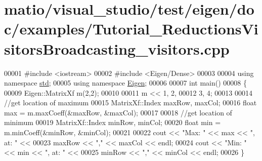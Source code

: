 \hypertarget{matio_2visual__studio_2test_2eigen_2doc_2examples_2_tutorial___reductions_visitors_broadcasting__visitors_8cpp_source}{}\section{matio/visual\+\_\+studio/test/eigen/doc/examples/\+Tutorial\+\_\+\+Reductions\+Visitors\+Broadcasting\+\_\+visitors.cpp}
\label{matio_2visual__studio_2test_2eigen_2doc_2examples_2_tutorial___reductions_visitors_broadcasting__visitors_8cpp_source}

\begin{DoxyCode}
00001 \textcolor{preprocessor}{#include <iostream>}
00002 \textcolor{preprocessor}{#include <Eigen/Dense>}
00003 
00004 \textcolor{keyword}{using namespace }\hyperlink{namespacestd}{std};
00005 \textcolor{keyword}{using namespace }\hyperlink{namespace_eigen}{Eigen};
00006 
00007 \textcolor{keywordtype}{int} main()
00008 \{
00009   Eigen::MatrixXf m(2,2);
00010   
00011   m << 1, 2,
00012        3, 4;
00013 
00014   \textcolor{comment}{//get location of maximum}
00015   MatrixXf::Index maxRow, maxCol;
00016   \textcolor{keywordtype}{float} max = m.maxCoeff(&maxRow, &maxCol);
00017 
00018   \textcolor{comment}{//get location of minimum}
00019   MatrixXf::Index minRow, minCol;
00020   \textcolor{keywordtype}{float} min = m.minCoeff(&minRow, &minCol);
00021 
00022   cout << \textcolor{stringliteral}{"Max: "} << max <<  \textcolor{stringliteral}{", at: "} <<
00023      maxRow << \textcolor{stringliteral}{","} << maxCol << endl;
00024   cout << \textcolor{stringliteral}{"Min: "} << min << \textcolor{stringliteral}{", at: "} <<
00025      minRow << \textcolor{stringliteral}{","} << minCol << endl;
00026 \}
\end{DoxyCode}
